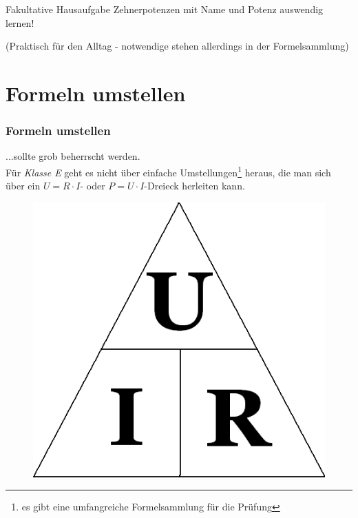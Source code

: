 \begin{frame}
  \begin{alertblock}{Fakultative Hausaufgabe}
    Zehnerpotenzen mit Name und Potenz auswendig lernen!

    \bigskip \tiny (Praktisch für den Alltag - notwendige stehen allerdings
    in der Formelsammlung)
  \end{alertblock}
\end{frame}


\section{Formeln umstellen}

\begin{frame}
  \frametitle{Formeln umstellen}

  ...sollte grob beherrscht werden. \\[2em]

  Für \emph{Klasse E} geht es nicht über einfache Umstellungen\footnote{es
  gibt eine umfangreiche Formelsammlung für die Prüfung} heraus, die man sich über ein
  $U = R\cdot I$- oder $P = U\cdot I$-Dreieck herleiten kann.

  \begin{center}
    \begin{figure}
      \includegraphics[height=.4\textheight]{e03/Ohm_law_triangle.png}
    \end{figure}
  \end{center}

\end{frame}

